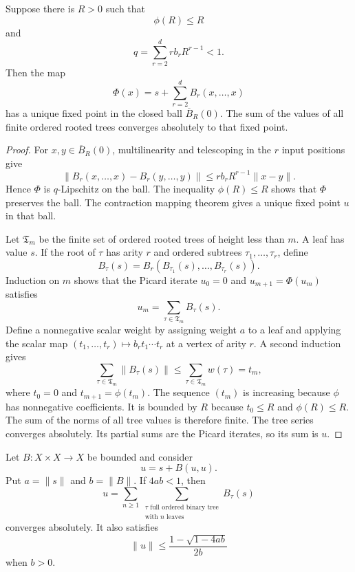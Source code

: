 \begin{theorem}\label{thm:polynomial_tree_expansion}
Suppose there is $R>0$ such that
\[
\phi(R)\le R
\]
and
\[
q=
\sum_{r=2}^{d}r b_rR^{r-1}<1.
\]
Then the map
\[
\Phi(x)=s+\sum_{r=2}^{d}B_r(x,\ldots,x)
\]
has a unique fixed point in the closed ball $\overline B_R(0)$.  The sum of the values of all finite ordered rooted trees converges absolutely to that fixed point.
\end{theorem}

\begin{proof}
For $x,y\in\overline B_R(0)$, multilinearity and telescoping in the $r$ input positions give
\[
\|B_r(x,\ldots,x)-B_r(y,\ldots,y)\|
\le
r b_rR^{r-1}\|x-y\|.
\]
Hence $\Phi$ is $q$-Lipschitz on the ball.  The inequality $\phi(R)\le R$ shows that $\Phi$ preserves the ball.  The contraction mapping theorem gives a unique fixed point $u$ in that ball.

Let $\mathfrak T_m$ be the finite set of ordered rooted trees of height less than $m$.  A leaf has value $s$.  If the root of $\tau$ has arity $r$ and ordered subtrees $\tau_1,\ldots,\tau_r$, define
\[
B_\tau(s)=B_r(B_{\tau_1}(s),\ldots,B_{\tau_r}(s)).
\]
Induction on $m$ shows that the Picard iterate $u_0=0$ and $u_{m+1}=\Phi(u_m)$ satisfies
\[
u_m=\sum_{\tau\in\mathfrak T_m}B_\tau(s).
\]
Define a nonnegative scalar weight by assigning weight $a$ to a leaf and applying the scalar map $(t_1,\ldots,t_r)\mapsto b_rt_1\cdots t_r$ at a vertex of arity $r$.  A second induction gives
\[
\sum_{\tau\in\mathfrak T_m}\|B_\tau(s)\|
\le
\sum_{\tau\in\mathfrak T_m}w(\tau)
=t_m,
\]
where $t_0=0$ and $t_{m+1}=\phi(t_m)$.  The sequence $(t_m)$ is increasing because $\phi$ has nonnegative coefficients.  It is bounded by $R$ because $t_0\le R$ and $\phi(R)\le R$.  The sum of the norms of all tree values is therefore finite.  The tree series converges absolutely.  Its partial sums are the Picard iterates, so its sum is $u$.
\end{proof}

\begin{corollary}\label{cor:quadratic_tree_expansion}
Let $B:X\times X\to X$ be bounded and consider
\[
u=s+B(u,u).
\]
Put $a=\|s\|$ and $b=\|B\|$.  If $4ab<1$, then
\[
u=
\sum_{n\ge1}
\sum_{\substack{\tau\text{ full ordered binary tree}\\\text{with }n\text{ leaves}}}
B_\tau(s)
\]
converges absolutely.  It also satisfies
\[
\|u\|
\le
\frac{1-\sqrt{1-4ab}}{2b}
\]
when $b>0$.
\end{corollary}

